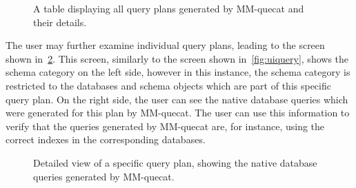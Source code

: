 \begin{figure}[h]
\centering
{} 
\caption{A table displaying all query plans generated by MM-quecat and their details.}
\label{fig:uiplans}
\end{figure}

The user may further examine individual query plans, leading to the screen shown in~\cref{fig:uidetail}.
This screen, similarly to the screen shown in~\cref{fig:uiquery}, shows the schema category on the left side, however in this instance, the schema category is restricted to the databases and schema objects which are part of this specific query plan.
On the right side, the user can see the native database queries which were generated for this plan by MM-quecat.
The user can use this information to verify that the queries generated by MM-quecat are, for instance, using the correct indexes in the corresponding databases.

\begin{figure}[h]
\centering
{} 
\caption{Detailed view of a specific query plan, showing the native database queries generated by MM-quecat.}
\label{fig:uidetail}
\end{figure}

